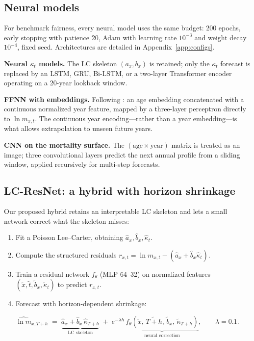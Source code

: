 \documentclass[11pt,a4paper]{article}
\begin{document}
\subsection{Neural models}

For benchmark fairness, every neural model uses the same budget: 200 epochs, early stopping with patience 20, Adam with learning rate $10^{-3}$ and weight decay $10^{-4}$, fixed seed. Architectures are detailed in Appendix~\ref{app:configs}.

\textbf{Neural $\kappa_t$ models.} The LC skeleton $(a_x, b_x)$ is retained; only the $\kappa_t$ forecast is replaced by an LSTM, GRU, Bi-LSTM, or a two-layer Transformer encoder operating on a 20-year lookback window.

\textbf{FFNN with embeddings.} Following \citet{richman2019neural}: an age embedding concatenated with a continuous normalized year feature, mapped by a three-layer perceptron directly to $\ln m_{x,t}$. The continuous year encoding---rather than a year embedding---is what allows extrapolation to unseen future years.

\textbf{CNN on the mortality surface.} The $(\text{age} \times \text{year})$ matrix is treated as an image; three convolutional layers predict the next annual profile from a sliding window, applied recursively for multi-step forecasts.

\subsection{LC-ResNet: a hybrid with horizon shrinkage}
\label{sec:lcresnet}

Our proposed hybrid retains an interpretable LC skeleton and lets a small network correct what the skeleton misses:

\begin{enumerate}
    \item Fit a Poisson Lee--Carter, obtaining $\hat{a}_x, \hat{b}_x, \hat{\kappa}_t$.
    \item Compute the structured residuals $r_{x,t} = \ln m_{x,t} - (\hat{a}_x + \hat{b}_x \hat{\kappa}_t)$.
    \item Train a residual network $f_\theta$ (MLP 64--32) on normalized features $(\tilde{x}, \tilde{t}, \tilde{b}_x, \tilde{\kappa}_t)$ to predict $r_{x,t}$.
    \item Forecast with horizon-dependent shrinkage:
\end{enumerate}
\begin{equation}
    \widehat{\ln m}_{x,T+h}
    \;=\;
    \underbrace{\hat{a}_x + \hat{b}_x\,\hat{\kappa}_{T+h}}_{\text{LC skeleton}}
    \;+\;
    e^{-\lambda h}\,
    \underbrace{f_\theta\!\left(\tilde{x},\, \widetilde{T{+}h},\, \tilde{b}_x,\, \tilde{\kappa}_{T+h}\right)}_{\text{neural correction}},
    \qquad \lambda = 0.1 .
    \label{eq:lcresnet}
\end{equation}
\end{document}
